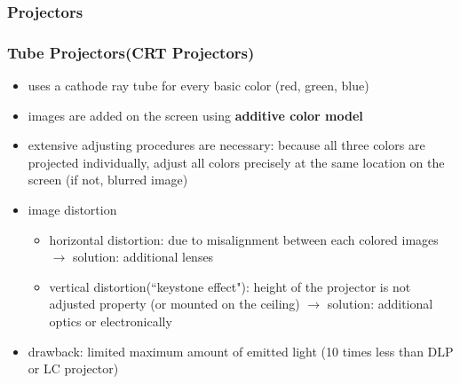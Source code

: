 \documentclass{standalone}
\begin{document}
\subsubsection{Projectors}

\subsubsection*{Tube Projectors(CRT Projectors)}
\begin{itemize}
	\item uses a cathode ray tube for every basic color (red, green, blue)
	\item images are added on the screen using \textbf{additive color model}
	\item extensive adjusting procedures are necessary: because all three colors are projected individually, adjust all colors precisely at the same location on the screen (if not, blurred image)
	\item image distortion
		\begin{itemize}
			\item horizontal distortion: due to misalignment between each colored images $\rightarrow$ solution: additional lenses
			\item vertical distortion(``keystone effect"): height of the projector is not adjusted property (or mounted on the ceiling) $\rightarrow$ solution: additional optics or electronically
		\end{itemize}
	\item drawback: limited maximum amount of emitted light (10 times less than DLP or LC projector)
\end{itemize}
\end{document}
